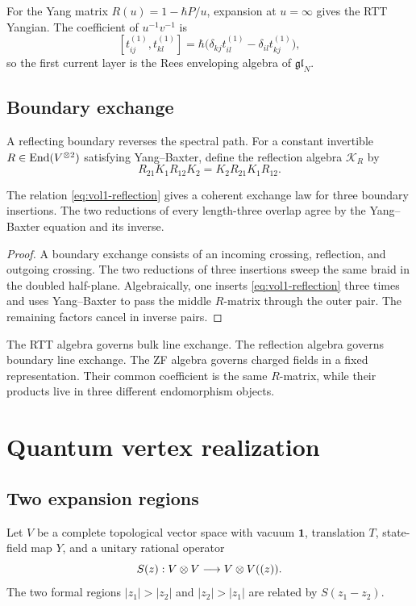 For the Yang matrix $R(u)=1-\hbar P/u$, expansion at $u=\infty$ gives the RTT Yangian.  The coefficient of $u^{-1}v^{-1}$ is
\[
 [t_{ij}^{(1)},t_{kl}^{(1)}]
 =\hbar\bigl(\delta_{kj}t_{il}^{(1)}-\delta_{il}t_{kj}^{(1)}\bigr),
\]
so the first current layer is the Rees enveloping algebra of $\mathfrak{gl}_N$.

\section{Boundary exchange}
A reflecting boundary reverses the spectral path.  For a constant invertible $R\in\operatorname{End}(V^{\otimes2})$ satisfying Yang--Baxter, define the reflection algebra $\mathcal K_R$ by
\begin{equation}\label{eq:vol1-reflection}
 R_{21}K_1R_{12}K_2
 =K_2R_{21}K_1R_{12}.
\end{equation}

\begin{theorem}
The relation \eqref{eq:vol1-reflection} gives a coherent exchange law for three boundary insertions.  The two reductions of every length-three overlap agree by the Yang--Baxter equation and its inverse.
\end{theorem}
\begin{proof}
A boundary exchange consists of an incoming crossing, reflection, and outgoing crossing.  The two reductions of three insertions sweep the same braid in the doubled half-plane.  Algebraically, one inserts \eqref{eq:vol1-reflection} three times and uses Yang--Baxter to pass the middle $R$-matrix through the outer pair.  The remaining factors cancel in inverse pairs.
\end{proof}

The RTT algebra governs bulk line exchange.  The reflection algebra governs boundary line exchange.  The ZF algebra governs charged fields in a fixed representation.  Their common coefficient is the same $R$-matrix, while their products live in three different endomorphism objects.

\chapter{Quantum vertex realization}
\section{Two expansion regions}
Let $V$ be a complete topological vector space with vacuum $\mathbf1$, translation $T$, state-field map $Y$, and a unitary rational operator
\[
 S(z):V\otimes V\longrightarrow V\otimes V((z)).
\]
The two formal regions $|z_1|>|z_2|$ and $|z_2|>|z_1|$ are related by $S(z_1-z_2)$.

